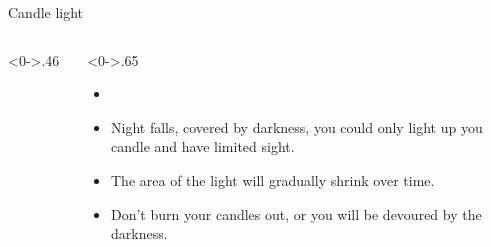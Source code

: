 \documentclass[notheorems]{beamer}
\begin{document}
\begin{framenl}{Candle light}
	\begin{columns}[T] %
		\begin{column}<0->{.46\textwidth}
			\begin{figure}[thpb]
				\centering
				\end{figure}
			\end{column}%
		\hfill%
		\begin{column}<0->{.65\textwidth}
			\begin{itemize}
			\item []
			\item<1-> Night falls, covered by darkness, you could only light up you candle and have limited sight.
			\item<2-> The area of the light will gradually shrink over time.
			\item<3-> Don't burn your candles out, or you will be devoured by the darkness. 
			\end{itemize}
		\end{column}%
	\end{columns}

\end{framenl}
\end{document}
